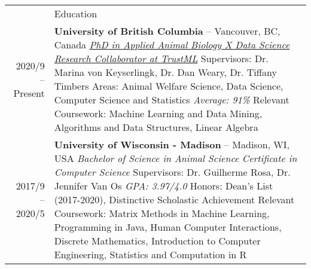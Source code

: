 \documentclass[letterpaper, 11pt]{article}
\newcommand{\headingfont}{\Large\color{OliveGreen}}
\newenvironment{SectionTable}[1]{
	\renewcommand*{\arraystretch}{1.7}
	\setlength{\tabcolsep}{10pt}
	\begin{longtable}{Rp{5.2in}} & #1 \\}
{\end{longtable}\vspace{-.3cm}}
\begin{document}
\begin{SectionTable}{\headingfont Education}
2020/9 -- Present & 
\textbf{University of British Columbia} -- Vancouver, BC, Canada \newline
\textit{\href{https://awp.landfood.ubc.ca/people/graduate-students/kehan-sheng/}{PhD in Applied Animal Biology X Data Science}} \newline 
\textit{\href{https://trustml.ubc.ca/profiles/sky-sheng}{Research Collaborator at TrustML}} \newline 
Supervisors: Dr. Marina von Keyserlingk, Dr. Dan Weary, Dr. Tiffany Timbers \newline
Areas: Animal Welfare Science, Data Science, Computer Science and Statistics \newline
\textit{Average: 91\%} \newline
Relevant Coursework: Machine Learning and Data Mining, Algorithms and Data Structures, Linear Algebra \\

2017/9 -- 2020/5 & 
\textbf{University of Wisconsin - Madison} -- Madison, WI, USA \newline
\textit{Bachelor of Science in Animal Science} \newline 
\textit{Certificate in Computer Science} \newline 
Supervisors: Dr. Guilherme Rosa, Dr. Jennifer Van Os \newline
\textit{GPA: 3.97/4.0} \newline
Honors: Dean's List (2017-2020), Distinctive Scholastic Achievement \newline
Relevant Coursework: Matrix Methods in Machine Learning, Programming in Java, Human Computer Interactions, Discrete Mathematics, Introduction to Computer Engineering, Statistics and Computation in R \\
\end{SectionTable}


\end{document}
